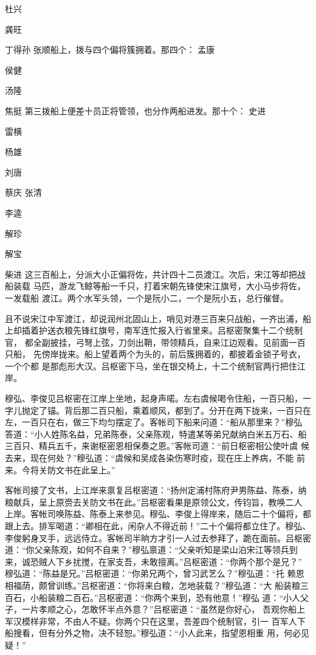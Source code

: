杜兴

龚旺

丁得孙
张顺船上，拨与四个偏将簇拥着。那四个：
孟康

侯健

汤隆

焦挺
第三拨船上便差十员正将管领，也分作两船进发。那十个：
史进

雷横

杨雄

刘唐

蔡庆
张清

李逵

解珍

解宝

柴进
这三百船上，分派大小正偏将佐，共计四十二员渡江。次后，宋江等却把战船装载
马匹，游龙飞鲸等船一千只，打着宋朝先锋使宋江旗号，大小马步将佐，一发载船
渡江。两个水军头领，一个是阮小二，一个是阮小五，总行催督。

且不说宋江中军渡江，却说润州北固山上，哨见对港三百来只战船，一齐出浦，船
上却插着护送衣粮先锋红旗号，南军连忙报入行省里来。吕枢密聚集十二个统制官，
都全副披挂，弓弩上弦，刀剑出鞘，带领精兵，自来江边观看。见前面一百只船，
先傍岸拢来。船上望着两个为头的，前后簇拥着的，都披着金锁子号衣，一个个都
是那彪形大汉。吕枢密下马，坐在银交椅上，十二个统制官两行把住江岸。

穆弘、李俊见吕枢密在江岸上坐地，起身声喏。左右虞候喝令住船，一百只船，一
字儿抛定了锚。背后那二百只船，乘着顺风，都到了。分开在两下拢来，一百只在
左，一百只在右，做三下均匀摆定了。客帐司下船来问道：“船从那里来？”穆弘
答道：“小人姓陈名益，兄弟陈泰，父亲陈观，特遣某等弟兄献纳白米五万石、船
三百只、精兵五千，来谢枢密恩相保奏之恩。”客帐司道：“前日枢密相公使叶虞
候去来，现在何处？”穆弘道：“虞候和吴成各染伤寒时疫，现在庄上养病，不能
前来。今将关防文书在此呈上。”

客帐司接了文书，上江岸来禀复吕枢密道：“扬州定浦村陈府尹男陈益、陈泰，纳
粮献兵，呈上原赍去关防文书在此。”吕枢密看果是原领公文，传钧旨，教唤二人
上岸。客帐司唤陈益、陈泰上来参见。穆弘、李俊上得岸来，随后二十个偏将，都
跟上去。排军喝道：“卿相在此，闲杂人不得近前！”二十个偏将都立住了。穆弘、
李俊躬身叉手，远远侍立。客帐司半晌方才引一人过去参拜了，跪在面前。吕枢密
道：“你父亲陈观，如何不自来？”穆弘禀道：“父亲听知是梁山泊宋江等领兵到
来，诚恐贼人下乡扰搅，在家支吾，未敢擅离。”吕枢密道：“你两个那个是兄？”
穆弘道：“陈益是兄。”吕枢密道：“你弟兄两个，曾习武艺么？”穆弘道：“托
赖恩相福荫，颇曾训练。”吕枢密道：“你将来白粮，怎地装载？”穆弘道：“大
船装粮三百石，小船装粮二百石。”吕枢密道：“你两个来到，恐有他意！”穆弘
道：“小人父子，一片孝顺之心，怎敢怀半点外意？”吕枢密道：“虽然是你好心，
吾观你船上军汉模样非常，不由人不疑。你两个只在这里，吾差四个统制官，引一
百军人下船搜看，但有分外之物，决不轻恕。”穆弘道：“小人此来，指望恩相重
用，何必见疑！”

